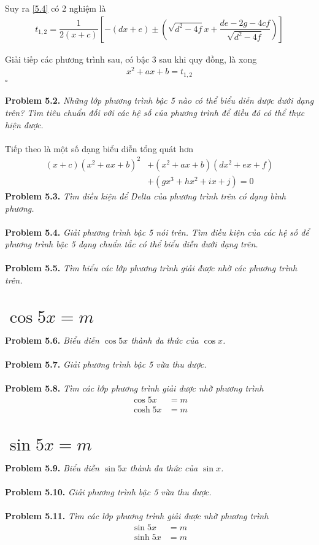 \documentclass[a4paper,oneside]{book}
\numberwithin{equation}{chapter}
\begin{document}
Suy ra \eqref{5.4} có 2 nghiệm là 
\begin{align}
{t_{1,2}} = \dfrac{1}{{2\left( {x + c} \right)}}\left[ { - \left( {dx + e} \right) \pm \left( {\sqrt {{d^2} - 4f} x + \dfrac{{de - 2g - 4cf}}{{\sqrt {{d^2} - 4f} }}} \right)} \right]
\end{align}

Giải tiếp các phương trình sau, có bậc 3 sau khi quy đồng, là xong
\begin{align}
{x^2} + ax + b = {t_{1,2}}
\end{align}
\hfill $\square$\\
\\
\textbf{Problem 5.2.} \textit{Những lớp phương trình bậc 5 nào có thể biểu diễn được dưới dạng trên? Tìm tiêu chuẩn đối với các hệ số của phương trình để điều đó có thể thực hiện được.}\\
\\
Tiếp theo là một số dạng biểu diễn tổng quát hơn
\begin{align}
\left( {x + c} \right){\left( {{x^2} + ax + b} \right)^2} &+ \left( {{x^2} + ax + b} \right)\left( {d{x^2} + ex + f} \right) \\
&+ \left( {g{x^3} + h{x^2} + ix + j} \right) = 0
\end{align}
\textbf{Problem 5.3.} \textit{Tìm điều kiện để Delta của phương trình trên có dạng bình phương.}\\
\\
\textbf{Problem 5.4.} \textit{Giải phương trình bậc 5 nói trên. Tìm điều kiện của các hệ số để phương trình bậc 5 dạng chuẩn tắc có thể biểu diễn dưới dạng trên.}\\
\\
\textbf{Problem 5.5.} \textit{Tìm hiểu các lớp phương trình giải được nhờ các phương trình trên.}
\section{$\cos 5x = m$}
\textbf{Problem 5.6.} \textit{Biểu diễn $\cos 5x$ thành đa thức của $\cos x$.}\\
\\
\textbf{Problem 5.7.} \textit{Giải phương trình bậc 5 vừa thu được.}\\
\\
\textbf{Problem 5.8.} \textit{Tìm các lớp phương trình giải được nhờ phương trình}
\begin{align}
\cos 5x &= m \\
\cosh 5x &= m
\end{align}
\section{$\sin 5x = m$}
\textbf{Problem 5.9.} \textit{Biểu diễn $\sin 5x$ thành đa thức của $\sin x$.}\\
\\
\textbf{Problem 5.10.} \textit{Giải phương trình bậc 5 vừa thu được.}\\
\\
\textbf{Problem 5.11.} \textit{Tìm các lớp phương trình giải được nhờ phương trình}
\begin{align}
\sin 5x &= m \\
\sinh 5x &= m
\end{align}
\end{document}
